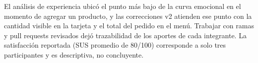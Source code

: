 El análisis de experiencia ubicó el punto más bajo de la curva emocional en el momento de agregar un producto, y las correcciones v2 atienden ese punto con la cantidad visible en la tarjeta y el total del pedido en el menú. Trabajar con ramas y pull requests revisados dejó trazabilidad de los aportes de cada integrante. La satisfacción reportada (SUS promedio de 80/100) corresponde a solo tres participantes y es descriptiva, no concluyente.
